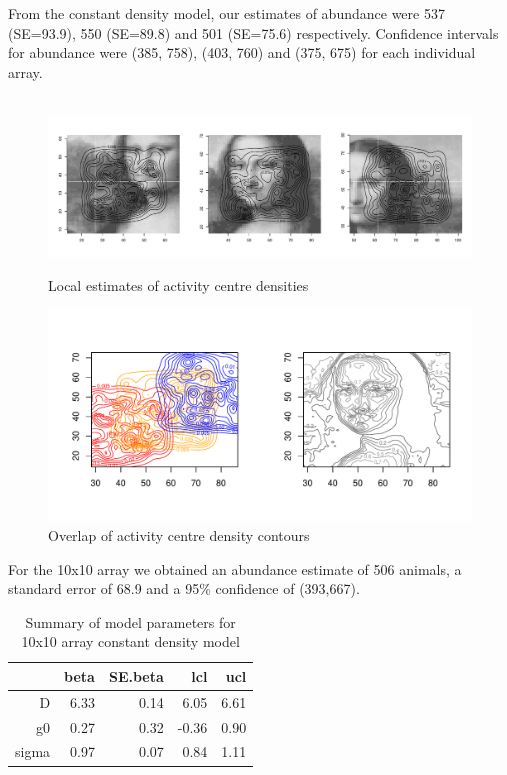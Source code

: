 \documentclass[a4paper,12pt]{article}
\begin{document}
From the constant density model, our estimates of abundance were 537 (SE=93.9), 550 (SE=89.8) and 501 (SE=75.6) respectively. Confidence intervals for abundance were (385, 758), (403, 760) and (375, 675) for each individual array.

\begin{figure}[H]
\centering
\hbox{\hspace{-3em} \includegraphics[width=1.2\textwidth]{localests}}
\caption{Local estimates of activity centre densities}
\label{localests}
\end{figure}

\begin{figure}[H]
\centering
\includegraphics[width=\textwidth]{overlap}
\caption{Overlap of activity centre density contours}
\label{overlap}
\end{figure}

For the 10x10 array we obtained an abundance estimate of 506 animals, a standard error of 68.9 and a 95\% confidence of (393,667).

\begin{table}[ht]
\centering
\begin{tabular}{rrrrr}
  \hline
 & beta & SE.beta & lcl & ucl \\ 
  \hline
D & 6.33 & 0.14 & 6.05 & 6.61 \\ 
  g0 & 0.27 & 0.32 & -0.36 & 0.90 \\ 
  sigma & 0.97 & 0.07 & 0.84 & 1.11 \\ 
   \hline
\end{tabular}
\caption{Summary of model parameters for 10x10 array constant density model}
\end{table}
\end{document}
